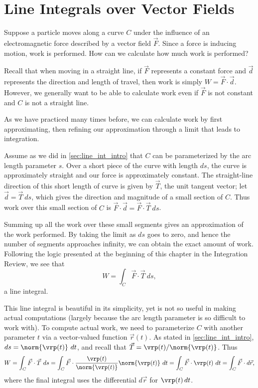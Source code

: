 \section{Line Integrals over Vector Fields}\label{sec:line_int_vf}

Suppose a particle moves along a curve $C$ under the influence of an electromagnetic force described by a vector field $\vec F$. Since a force is inducing motion, work is performed. How can we calculate how much work is performed?

Recall that when moving in a straight line, if $\vec F$ represents a constant force and $\vec d$ represents the direction and length of travel, then work is simply $W = \vec F\cdot \vec d$. However, we generally want to be able to calculate work even if $\vec F$ is not constant and $C$ is not a straight line.

As we have practiced many times before, we can calculate work by first approximating, then refining our approximation through a limit that leads to integration. 

Assume as we did in \autoref{sec:line_int_intro} that $C$ can be parameterized by the arc length parameter $s$. Over a short piece of the curve with length $ds$, the curve is approximately straight and our force is approximately constant. The straight-line direction of this short length of curve is given by $\vec T$, the unit tangent vector;   let $\vec d = \vec T\ ds$, which gives  the direction and magnitude of a small section of $C$. Thus work over this small section of $C$ is $\vec F \cdot \vec d = \vec F\cdot \vec T\ ds$. 

Summing up all the work over these small segments gives an approximation of the work performed. By taking the limit as $ds$ goes to zero, and hence the number of segments approaches infinity, we can obtain the exact amount of work. Following the logic presented at the beginning of this chapter in the Integration Review, we see that 
\[W = \int_C \vec F\cdot \vec T\ ds,\]
a line integral.

This line integral is beautiful in its simplicity, yet is not so useful in making actual computations (largely because the arc length parameter is so difficult to work with). To compute actual work, we need to parameterize $C$ with another parameter  $t$ via a vector-valued function $\vec r(t)$. As stated in \autoref{sec:line_int_intro}, $ds = \norm{\vrp(t)}\ dt$, and recall that $\vec T = \vrp(t)/\norm{\vrp(t)}$. Thus
\begin{equation}
W = \int_C \vec F\cdot\vec T\ ds
= \int_C \vec F\cdot \frac{\vrp(t)}{\norm{\vrp(t)}}\norm{\vrp(t)}\ dt
= \int_C\vec F\cdot \vrp(t)\ dt = \int_C \vec F\cdot d\vec r,
\label{eq:line_integral}
\end{equation}
where the final integral uses the differential $d\vec r$ for $\vrp(t)\,dt$.

